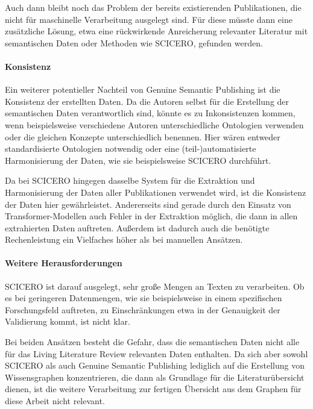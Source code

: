 Auch dann bleibt noch das Problem der bereits existierenden Publikationen, die nicht für maschinelle Verarbeitung ausgelegt sind.
Für diese müsste dann eine zusätzliche Lösung, etwa eine rückwirkende Anreicherung relevanter Literatur mit semantischen Daten oder Methoden wie SCICERO, gefunden werden.

\paragraph{Konsistenz}

Ein weiterer potentieller Nachteil von Genuine Semantic Publishing ist die Konsistenz der erstellten Daten.
Da die Autoren selbst für die Erstellung der semantischen Daten verantwortlich sind, könnte es zu Inkonsistenzen kommen, wenn beispielsweise verschiedene Autoren unterschiedliche Ontologien verwenden oder die gleichen Konzepte unterschiedlich benennen.
Hier wären entweder standardisierte Ontologien notwendig oder eine (teil-)automatisierte Harmonisierung der Daten, wie sie beispielsweise SCICERO durchführt.

Da bei SCICERO hingegen dasselbe System für die Extraktion und Harmonisierung der Daten aller Publikationen verwendet wird, ist die Konsistenz der Daten hier gewährleistet.
Andererseits sind \textemdash gerade durch den Einsatz von Transformer-Modellen \textemdash auch Fehler in der Extraktion möglich, die dann in allen extrahierten Daten auftreten.
Außerdem ist dadurch auch die benötigte Rechenleistung ein Vielfaches höher als bei manuellen Ansätzen.


\paragraph{Weitere Herausforderungen}

SCICERO ist darauf ausgelegt, sehr große Mengen an Texten zu verarbeiten.
Ob es bei geringeren Datenmengen, wie sie beispielsweise in einem spezifischen Forschungsfeld auftreten, zu Einschränkungen \textemdash etwa in der Genauigkeit der Validierung \textemdash kommt, ist nicht klar.

Bei beiden Ansätzen besteht die Gefahr, dass die semantischen Daten nicht alle für das Living Literature Review relevanten Daten enthalten.
Da sich aber sowohl SCICERO als auch Genuine Semantic Publishing lediglich auf die Erstellung von Wissensgraphen konzentrieren, die dann als Grundlage für die Literaturübersicht dienen, ist die weitere Verarbeitung zur fertigen Übersicht aus dem Graphen für diese Arbeit nicht relevant.
